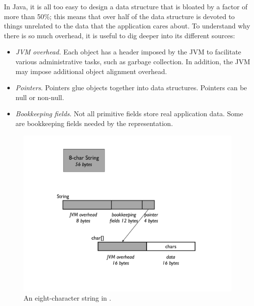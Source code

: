 In Java, it is all too easy to design a data structure that is bloated by a
factor of more than 50\%; this means that over half of the data structure is
devoted to things unrelated to the data that the application cares about. To
understand why there is so much overhead, it is useful to dig deeper into its
different sources:
\begin{itemize}
\item \emph{JVM overhead.}   Each
object has a header imposed by the JVM to facilitate various administrative
tasks, such as garbage collection. In addition, the JVM may impose additional
object alignment overhead.
\item \emph{Pointers}. Pointers glue objects together into data structures.
Pointers can be null or non-null.
\item \emph{Bookkeeping fields}.  Not all primitive
fields store real application data. Some are bookkeeping fields needed by the
representation.
\end{itemize}


\begin{figure}
  \centering
  \includegraphics[width=.70\textwidth]{part1/Figures/memoryhealth/eight-char-string.pdf}
  \caption{An eight-character string in \javasix.}
  \label{fig:eight-char-string}
\end{figure}

